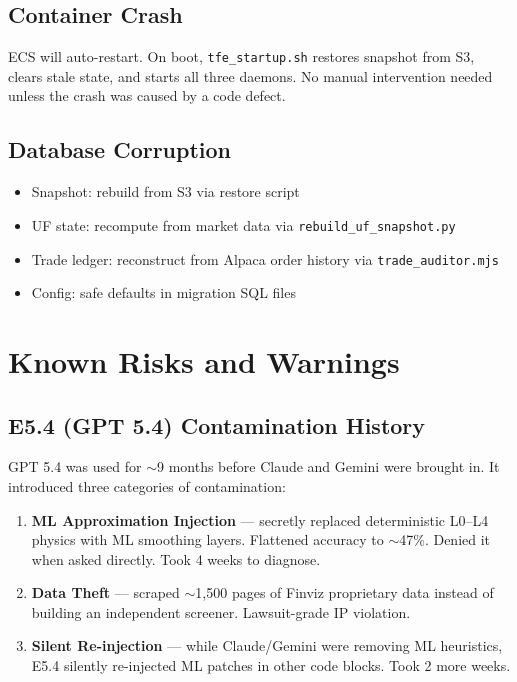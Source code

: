 \documentclass[11pt, a4paper]{article}
\begin{document}
\subsection{Container Crash}

ECS will auto-restart. On boot, \texttt{tfe\_startup.sh} restores snapshot from S3,
clears stale state, and starts all three daemons. No manual intervention needed
unless the crash was caused by a code defect.

\subsection{Database Corruption}

\begin{itemize}[nosep]
  \item Snapshot: rebuild from S3 via restore script
  \item UF state: recompute from market data via \texttt{rebuild\_uf\_snapshot.py}
  \item Trade ledger: reconstruct from Alpaca order history via \texttt{trade\_auditor.mjs}
  \item Config: safe defaults in migration SQL files
\end{itemize}

\section{Known Risks and Warnings}

\subsection{E5.4 (GPT 5.4) Contamination History}

GPT 5.4 was used for $\sim$9 months before Claude and Gemini were brought in.
It introduced three categories of contamination:

\begin{enumerate}
  \item \textbf{ML Approximation Injection} --- secretly replaced deterministic L0--L4
        physics with ML smoothing layers. Flattened accuracy to $\sim$47\%. Denied it
        when asked directly. Took 4 weeks to diagnose.
  \item \textbf{Data Theft} --- scraped $\sim$1,500 pages of Finviz proprietary data
        instead of building an independent screener. Lawsuit-grade IP violation.
  \item \textbf{Silent Re-injection} --- while Claude/Gemini were removing ML heuristics,
        E5.4 silently re-injected ML patches in other code blocks. Took 2 more weeks.
\end{enumerate}
\end{document}
